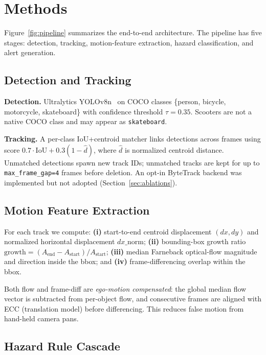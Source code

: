 \documentclass[10pt,twocolumn,letterpaper]{article}
\begin{document}
\section{Methods}

Figure~\ref{fig:pipeline} summarizes the end-to-end architecture. The pipeline has five stages: detection, tracking, motion-feature extraction, hazard classification, and alert generation.

\subsection{Detection and Tracking}

\textbf{Detection.} Ultralytics YOLOv8n~\cite{yolo} on COCO classes \{person, bicycle, motorcycle, skateboard\} with confidence threshold $\tau=0.35$. Scooters are not a native COCO class and may appear as \texttt{skateboard}.

\textbf{Tracking.} A per-class IoU+centroid matcher links detections across frames using score $0.7\cdot\text{IoU} + 0.3(1-\hat d)$, where $\hat d$ is normalized centroid distance. Unmatched detections spawn new track IDs; unmatched tracks are kept for up to \texttt{max\_frame\_gap=4} frames before deletion. An opt-in ByteTrack backend was implemented but not adopted (Section~\ref{sec:ablations}).

\subsection{Motion Feature Extraction}

For each track we compute:
\textbf{(i)} start-to-end centroid displacement $(dx, dy)$ and normalized horizontal displacement $dx\_\text{norm}$;
\textbf{(ii)} bounding-box growth ratio $\text{growth}=(A_\text{end}-A_\text{start})/A_\text{start}$;
\textbf{(iii)} median Farneback optical-flow magnitude and direction inside the bbox; and
\textbf{(iv)} frame-differencing overlap within the bbox.

Both flow and frame-diff are \emph{ego-motion compensated}: the global median flow vector is subtracted from per-object flow, and consecutive frames are aligned with ECC (translation model) before differencing. This reduces false motion from hand-held camera pans.

\subsection{Hazard Rule Cascade}
\end{document}
